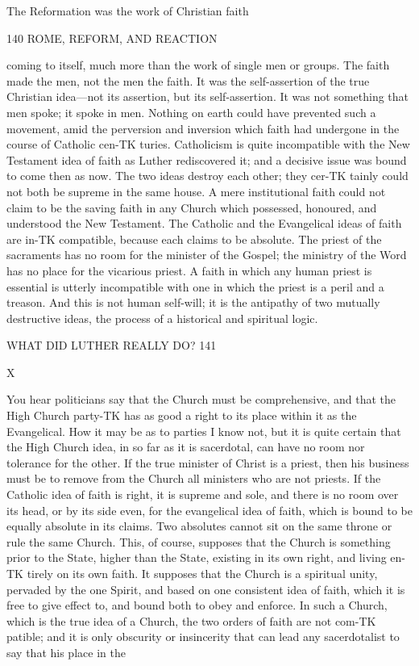 \documentclass[12pt,a5paper,twoside]{book}
\begin{document}
{The Reformation was the work of Christian faith 



140 ROME, REFORM, AND REACTION 

coming to itself, much more than the work of single 
men or groups. The faith made the men, not the 
men the faith. It was the self-assertion of the true 
Christian idea---not its assertion, but its self-assertion. 
It was not something that men spoke; it spoke in 
men. Nothing on earth could have prevented such a 
movement, amid the perversion and inversion which 
faith had undergone in the course of Catholic cen-TK
turies. Catholicism is quite incompatible with the 
New Testament idea of faith as Luther rediscovered 
it; and a decisive issue was bound to come then as 
now. The two ideas destroy each other; they cer-TK
tainly could not both be supreme in the same house. 
A mere institutional faith could not claim to be 
the saving faith in any Church which possessed, 
honoured, and understood the New Testament. The 
Catholic and the Evangelical ideas of faith are in-TK
compatible, because each claims to be absolute. The 
priest of the sacraments has no room for the minister 
of the Gospel; the ministry of the Word has no 
place for the vicarious priest. A faith in which any 
human priest is essential is utterly incompatible with 
one in which the priest is a peril and a treason. And 
this is not human self-will; it is the antipathy of two 
mutually destructive ideas, the process of a historical 
and spiritual logic. 



WHAT DID LUTHER REALLY DO? 141 

X 

You hear politicians say that the Church must 
be comprehensive, and that the High Church party-TK
has as good a right to its place within it as the 
Evangelical. How it may be as to parties I know 
not, but it is quite certain that the High Church 
idea, in so far as it is sacerdotal, can have no room 
nor tolerance for the other. If the true minister of 
Christ is a priest, then his business must be to 
remove from the Church all ministers who are not 
priests. If the Catholic idea of faith is right, it is 
supreme and sole, and there is no room over its head, 
or by its side even, for the evangelical idea of faith, 
which is bound to be equally absolute in its claims. 
Two absolutes cannot sit on the same throne or rule 
the same Church. This, of course, supposes that the 
Church is something prior to the State, higher than 
the State, existing in its own right, and living en-TK
tirely on its own faith. It supposes that the Church 
is a spiritual unity, pervaded by the one Spirit, and 
based on one consistent idea of faith, which it is 
free to give effect to, and bound both to obey and 
enforce. In such a Church, which is the true idea 
of a Church, the two orders of faith are not com-TK
patible; and it is only obscurity or insincerity that 
can lead any sacerdotalist to say that his place in the 



}
\end{document}
